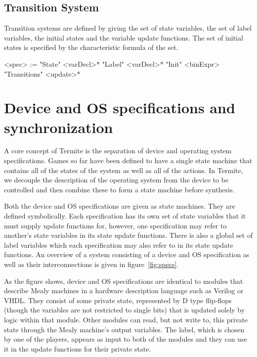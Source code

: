 \subsection{Transition System}

Transition systems are defined by giving the set of state variables, the set of label variables, the initial states and the variable update functions. The set of initial states is specified by the characteristic formula of the set.

\begin{bnflisting}
    <spec>     := "State"       <varDecl>* 
                  "Label"       <varDecl>* 
                  "Init"        <binExpr>
                  "Transitions" <update>*
\end{bnflisting}

\section{Device and OS specifications and synchronization}

A core concept of Termite is the separation of device and operating system specifications. Games so far have been defined to have a single state machine that contains all of the states of the system as well as all of the actions. In Termite, we decouple the description of the operating system from the device to be controlled and then combine these to form a state machine before synthesis.

Both the device and OS specifications are given as state machines. They are defined symbolically. Each specification has its own set of state variables that it must supply update functions for, however, one specification may refer to another's state variables in its state update functions. There is also a global set of label variables which each specification may also refer to in its state update functions. An overview of a system consisting of a device and OS specification as well as their interconnections is given in figure~\ref{fig:specs}.

As the figure shows, device and OS specifications are identical to modules that describe Mealy machines in a hardware description language such as Verilog or VHDL\@. They consist of some private state, represented by D type flip-flops (though the variables are not restricted to single bits) that is updated solely by logic within that module. Other modules can read, but not write to, this private state through the Mealy machine's output variables. The label, which is chosen by one of the players, appears as input to both of the modules and they can use it in the update functions for their private state.

